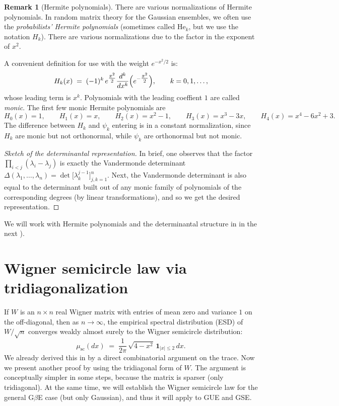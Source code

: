 \documentclass[letterpaper,11pt,oneside,reqno]{book}
\numberwithin{equation}{chapter}  %
\theoremstyle{definition}
\newtheorem{remark}[proposition]{Remark}
\begin{document}
\begin{remark}[Hermite polynomials]
  There are various normalizations of Hermite polynomials.
  In random matrix theory for the Gaussian ensembles,
  we often use the \emph{probabilists' Hermite polynomials}
	(sometimes called \(\mathrm{He}_k\), but we use the notation $H_k$).
	There are various normalizations due to the factor in the exponent
	of $x^2$.

  A convenient definition for use with the weight \(e^{-x^2/2}\) is:
	\begin{equation}
		\label{lecture4:eq:hermite-polynomial}
    H_k(x)
    \;=\;
    (-1)^k\, e^{\tfrac{x^2}{2}}
    \frac{d^k}{dx^k}
    \Bigl(e^{-\tfrac{x^2}{2}}\Bigr),
		\qquad
		k=0,1,\ldots,
\end{equation}
  whose leading term is \(x^k\).
	Polynomials with the leading coeffient \(1\) are called \emph{monic}.
	The first few monic Hermite polynomials are
	\[
		H_0(x) = 1,\qquad
		H_1(x) = x,\qquad
		H_2(x) = x^2 - 1,\qquad
		H_3(x) = x^3 - 3x,\qquad
		H_4(x) = x^4 - 6x^2 + 3.
	\]
	The difference between $H_k$ and $\psi_k$ entering 
	is in a constant normalization,
	since $H_k$ are monic but not orthonormal,
	while $\psi_k$ are orthonormal but not monic.
\end{remark}

\begin{proof}[Sketch of the determinantal representation]
  In brief, one observes that the factor
  \(\prod_{i<j}(\lambda_i - \lambda_j)\)
  is exactly the Vandermonde determinant
  \(\Delta(\lambda_1,\dots,\lambda_n)
  = \det\bigl[\lambda_k^{j-1}\bigr]_{j,k=1}^n\).
	Next, the Vandermonde determinant is also equal to
	the determinant built out of any monic family of polynomials of the corresponding
	degrees (by linear transformations), and so we get the desired
	representation.
\end{proof}

We will work with Hermite polynomials
and the determinantal structure in 
in the next
).

\section{Wigner semicircle law via tridiagonalization}
\label{lecture4:sec:semicircle-tridiagonal}


If $W$ is an $n\times n$ real Wigner matrix with entries of
mean zero and variance $1$ on the off-diagonal, then as
$n\to\infty$, the empirical spectral distribution (ESD) of
$W/\sqrt{n}$ converges weakly almost surely to the Wigner
semicircle distribution:
\[
  \mu_{\mathrm{sc}}(dx)
  \;=\;
  \frac{1}{2\pi}\,\sqrt{4 - x^2}\,\mathbf{1}_{|x|\le2}\,dx.
\]
We already derived this in
by a direct combinatorial argument on the trace. Now we present another proof by using the tridiagonal form of $W$.  The argument is conceptually simpler in some steps, because the matrix is sparser (only tridiagonal).
At the same time, we will establish the Wigner
semicircle law for the general G$\beta$E case (but only Gaussian), and
thus it will apply to GUE and GSE.
\end{document}
